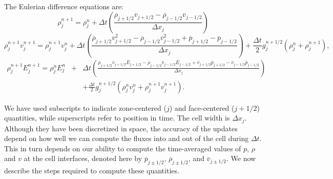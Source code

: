 The Eulerian difference equations are:
%
\newcommand{\avp}[1]{\overline{#1}_{j+1/2}}
\newcommand{\avm}[1]{\overline{#1}_{j-1/2}}
\begin{equation}
\rho_j^{n+1} = \rho_j^{n} + \Delta t \left( 
                      \frac{ \avp{\rho}\avp{v} -  \avm{\rho}\avm{v} } {\Delta x_j}
            \right)
     \label{eq:mass_diff}
\end{equation}
\begin{equation}
\rho_j^{n+1} v_{j}^{n+1} =
       \rho_j^{n+1} v_j^n  + \Delta t \left(
          \frac{ \avp{\rho} \avp{v}^2 - \avm{\rho} \avm{v}^2 + \avp{p} - \avm{p}} {\Delta x_j}
             \right)
     + \frac{ \Delta t }{2} g_j^{n+1/2} (\rho_j^n + \rho_j^{n+1}), 
     \label{eq:momentum_diff}
\end{equation}
\begin{eqnarray}
\rho_j^{n+1} E_j^{n+1}  = 
       \rho_j^n E_j^n  & + & \Delta t  \left(
            \frac{  \avp{\rho} \avp{v} \avp{E}  - \avm{\rho} \avm{v} \avm{E}  +
                       \avp{v} \avp{p}    - \avm{v} \avm{p} } {\Delta x_j}
             \right) \nonumber \\
         & & + \frac{ \Delta t }{2} g_j^{n+1/2} (\rho_j^n v_j^n + \rho_j^{n+1} v_j^{n+1} ).
     \label{eq:energy_diff}
\end{eqnarray}

We have used subscripts to indicate zone-centered ($j$)
and face-centered ($j+1/2$) quantities, while superscripts refer to
position in time.  The cell width is $\Delta x_j$.
Although they have been discretized
in space, the accuracy of the updates depend on how well we can compute
the fluxes into and out of the cell during $\Delta t$.  
This in turn depends on our ability to compute the time-averaged 
values of $p$, $\rho$ and $v$ at the cell interfaces, denoted here
by $\overline{p}_{j\pm 1/2}$, $\overline{\rho}_{j\pm 1/2}$, and $\overline{v}_{j\pm 1/2}$.  We now
describe the steps required to compute these quantities.

